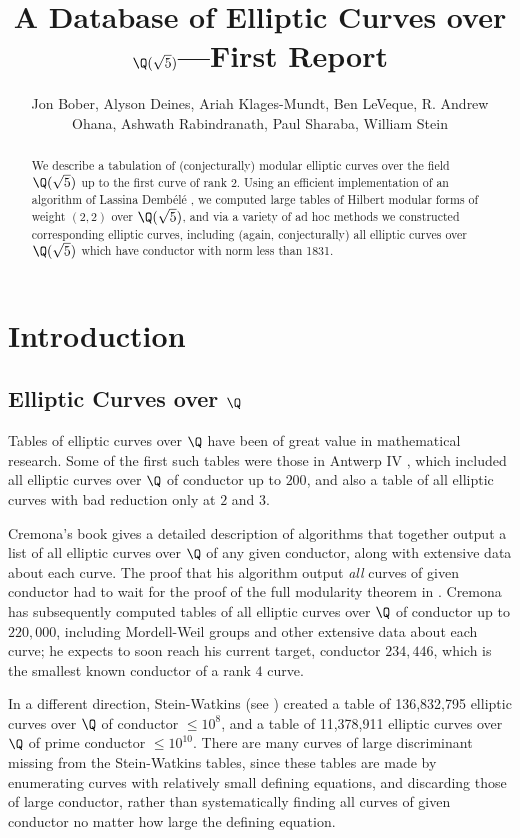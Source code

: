 \documentclass{amsart}
\title{A Database of Elliptic Curves over $\Q(\sqrt{5})$---First Report}
\author[Bober et al.]{Jon Bober, Alyson Deines, Ariah Klages-Mundt, Ben
  LeVeque, R. Andrew Ohana, Ashwath Rabindranath, Paul Sharaba, William
  Stein}
\newcommand{\dembele}{Demb\'el{\'e}\xspace}
\begin{document}
\begin{abstract} 
We describe a tabulation of (conjecturally) modular
elliptic curves over the field $\Q(\sqrt5)$ up to the first curve of rank $2$. Using an
efficient implementation of an algorithm of Lassina \dembele
\cite{dembele:hilbert5}, we computed large tables of Hilbert modular
forms of weight $(2,2)$ over $\Q(\sqrt 5)$, and via a variety of ad hoc
methods we constructed corresponding elliptic curves, including
(again, conjecturally) all elliptic curves over $\Q(\sqrt5)$ which have
conductor with norm less than 1831. 
\end{abstract} 

\maketitle

\section{Introduction}\label{sec:intro}

\subsection{Elliptic Curves over $\Q$}
Tables of elliptic curves over $\Q$ have been of great value in
mathematical research.  Some of the first such tables were those in
Antwerp IV \cite{antwerpiv}, which included all elliptic curves over
$\Q$ of conductor up to $200$, and also a table of all elliptic curves
with bad reduction only at $2$ and $3$.  

Cremona's book \cite{cremona:algs} gives a detailed description of
algorithms that together output a list of all elliptic curves over
$\Q$ of any given conductor, along with extensive data about each
curve.  The proof that his algorithm output {\em all} curves of given
conductor had to wait for the proof of the full modularity theorem in
\cite{breuil-conrad-diamond-taylor}.  Cremona has subsequently
computed tables \cite{cremona:onlinetables} of all elliptic curves
over $\Q$ of conductor up to $220,\!000$, including Mordell-Weil
groups and other extensive data about each curve; he expects to soon
reach his current target, conductor $234,\!446$, which is the smallest
known conductor of a rank $4$ curve.

In a different direction, Stein-Watkins (see \cite{stein-watkins:ants5, bmsw:bulletins}) 
created a table of 136,832,795 elliptic curves over $\Q$ of conductor $\leq 10^8$, and a
table of 11,378,911 elliptic curves over $\Q$ of prime conductor $\leq
10^{10}$. 
There are many curves of large discriminant missing from the
Stein-Watkins tables, since these tables are made by enumerating
curves with relatively small defining equations, and discarding those
of large conductor, rather than systematically finding all curves of
given conductor no matter how large the defining equation.
\end{document}
